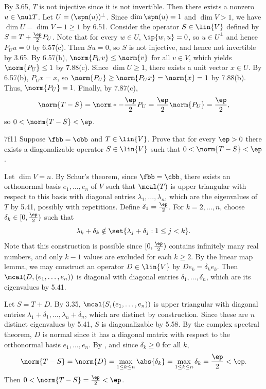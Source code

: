 \begin{sol}
    By 3.65, $T$ is not injective since it is not invertible.
    Then there exists a nonzero $u \in \nul T$.
    Let $U = (\spn(u))^\perp$.
    Since $\dim \spn(u) = 1$ and $\dim V > 1$, we have $\dim U = \dim V - 1 \geq 1$ by 6.51.
    Consider the operator $S \in \lin{V}$ defined by $S = T + \frac{\ep}{2} P_U$.
    Note that for every $w \in U$, $\ip{w, u} = 0$, so $u \in U^\perp$ and hence $P_U u = 0$ by 6.57(c).
    Then $Su = 0$, so $S$ is not injective, and hence not invertible by 3.65.
    By 6.57(h), $\norm{P_U v} \leq \norm{v}$ for all $v \in V$, which yields $\norm{P_U} \leq 1$ by 7.88(c).
    Since $\dim U \geq 1$, there exists a unit vector $x \in U$.
    By 6.57(b), $P_U x = x$, so $\norm{P_U} \geq \norm{P_U x} = \norm{x} = 1$ by 7.88(b).
    Thus, $\norm{P_U} = 1$.
    Finally, by 7.87(c),
    \[
        \norm{T - S} = \norm*{-\frac{\ep}{2} P_U} = \frac{\ep}{2} \norm{P_U} = \frac{\ep}{2},
    \]
    so $0 < \norm{T - S} < \ep$.
\end{sol}

\begin{exercise}{7f11}
    Suppose $\fbb = \cbb$ and $T \in \lin{V}$.
    Prove that for every $\ep > 0$ there exists a diagonalizable operator $S \in \lin{V}$ such that $0 < \norm{T - S} < \ep$.

\end{exercise}

\begin{sol}
    Let $\dim V = n$.
    By Schur's theorem, since $\fbb = \cbb$, there exists an orthonormal basis $e_1, \ldots, e_n$ of $V$ such that $\mcal(T)$ is upper triangular with respect to this basis with diagonal entries $\lambda_1, \ldots, \lambda_n$, which are the eigenvalues of $T$ by 5.41, possibly with repetitions.
    Define $\delta_1 = \frac{\ep}{2}$.
    For $k = 2, \ldots, n$, choose $\delta_k \in [0, \frac{\ep}{2})$ such that
    \[
        \lambda_k + \delta_k \notin \set{\lambda_j + \delta_j : 1 \leq j < k}.
    \]
    Note that this construction is possible since $[0, \frac{\ep}{2})$ contains infinitely many real numbers, and only $k-1$ values are excluded for each $k \geq 2$.
    By the linear map lemma, we may construct an operator $D \in \lin{V}$ by $D e_k = \delta_k e_k$.
    Then $\mcal(D, (e_1, \ldots, e_n))$ is diagonal with diagonal entries $\delta_1, \ldots, \delta_n$, which are its eigenvalues by 5.41.
    
    Let $S = T + D$.
    By 3.35, $\mcal(S, (e_1, \ldots, e_n))$ is upper triangular with diagonal entries $\lambda_1 + \delta_1, \ldots, \lambda_n + \delta_n$, which are distinct by construction.
    Since these are $n$ distinct eigenvalues by 5.41, $S$ is diagonalizable by 5.58.
    By the complex spectral theorem, $D$ is normal since it has a diagonal matrix with respect to the orthonormal basis $e_1, \ldots, e_n$.
    By , and since $\delta_k \geq 0$ for all $k$,
    \[
        \norm{T - S} = \norm{D} = \max_{1 \leq k \leq n} \abs{\delta_k} = \max_{1 \leq k \leq n} \delta_k = \frac{\ep}{2} < \ep.
    \]
    Then $0 < \norm{T - S} = \frac{\ep}{2} < \ep$.
\end{sol}

